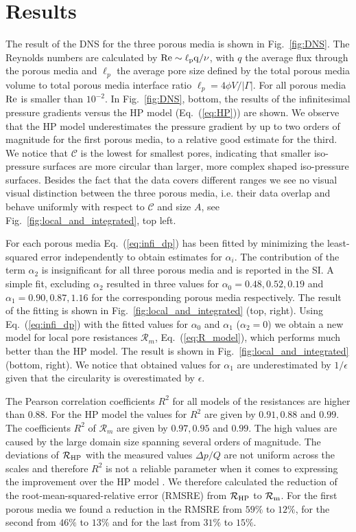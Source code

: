 \documentclass[draft]{agujournal2019}
\begin{document}
\section{Results}


The result of the DNS for the three porous media is shown in Fig.~\ref{fig:DNS}. The Reynolds numbers are calculated by $\rm{Re} \sim \ell_p q/\nu$, with $q$ the average flux through the porous media and $\ell_p$ the average pore size defined by the total porous media volume to total porous media interface ratio $\ell_p = 4 \phi V/|\Gamma|$. For all porous media $\rm{Re}$ is smaller than $10^{-2}$. In Fig.~\ref{fig:DNS}, bottom, the results of the infinitesimal pressure gradients versus the HP model (Eq.~(\ref{eq:HP})) are shown. We observe that the HP model underestimates the pressure gradient by up to two orders of magnitude for the first porous media, to a relative good estimate for the third. We notice that $\mathcal{C}$ is the lowest for smallest pores, indicating that smaller iso-pressure surfaces are more circular than larger, more complex shaped iso-pressure surfaces. Besides the fact that the data covers different ranges we see no visual visual distinction between the three porous media, i.e. their data overlap and behave uniformly with respect to $\mathcal{C}$ and size $A$, see Fig.~\ref{fig:local_and_integrated}, top left.
 
For each porous media Eq.~(\ref{eq:infi_dp}) has been fitted by minimizing the least-squared error independently to obtain estimates for $\alpha_i$. The contribution of the term $\alpha_2$ is insignificant for all three porous media and is reported in the SI. A simple fit, excluding $\alpha_2$ resulted in three values for $\alpha_0 = 0.48, 0.52, 0.19$ and $\alpha_1 = 0.90, 0.87, 1.16$ for the corresponding porous media respectively. The result of the fitting is shown in Fig.~\ref{fig:local_and_integrated} (top, right). Using Eq.~(\ref{eq:infi_dp}) with the fitted values for $\alpha_0$ and $\alpha_1$ ($\alpha_2 = 0$) we obtain a new model for local pore resistances $\mathcal{R}_m$, Eq.~(\ref{eq:R_model}), which performs much better than the HP model. The result is shown in Fig.~\ref{fig:local_and_integrated} (bottom, right). We notice that obtained values for $\alpha_1$ are underestimated by $1/\epsilon$ given that the circularity is overestimated by $\epsilon$. 

The Pearson correlation coefficients $R^2$ for all models of the resistances are higher than $0.88$. For the HP model the values for $R^2$ are given by $0.91, 0.88$ and $0.99$. The coefficients $R^2$ of $\mathcal{R}_m$ are given by $0.97, 0.95$ and $0.99$. The high values are caused by the large domain size spanning several orders of magnitude. The deviations of $\mathcal{R}_{\rm{HP}}$ with the measured values $\Delta p/Q$ are not uniform across the scales and  therefore $R^2$ is not a reliable parameter when it comes to expressing the improvement over the HP model \cite{wilcox_comparing_2009}. We therefore calculated the reduction of the root-mean-squared-relative error (RMSRE) from $\mathcal{R}_{\rm{HP}}$ to $\mathcal{R}_{\rm{m}}$. For the first porous media we found a reduction in the RMSRE from $59\%$ to $12\%$, for the second from $46\%$ to $13\%$ and for the last from $31\%$ to $15\%$.  
\end{document}
